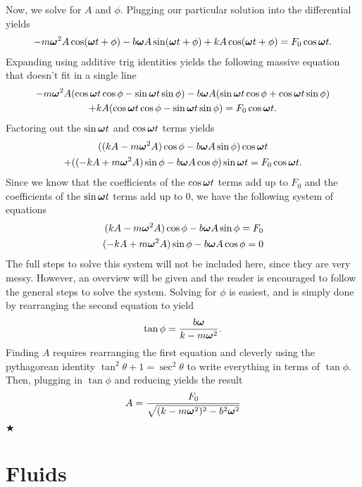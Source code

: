 \noindent Now, we solve for $A$ and $\phi$. Plugging our particular solution into the differential yields
\begin{gather*}
    -m\boldsymbol{\omega}^2A\cos(\boldsymbol{\omega} t +\phi)-b\boldsymbol{\omega} A\sin(\boldsymbol{\omega} t+\phi)+kA\cos(\boldsymbol{\omega} t+\phi) = F_0\cos\boldsymbol{\omega} t.
\end{gather*}
\noindent Expanding using additive trig identities yields the following massive equation that doesn't fit in a single line
\begin{gather*}
        -m\boldsymbol{\omega}^2 A(\cos\boldsymbol{\omega} t\cos\phi-\sin\boldsymbol{\omega} t\sin\phi) - b\boldsymbol{\omega} A(\sin\boldsymbol{\omega} t\cos\phi+\cos\boldsymbol{\omega} t\sin\phi)\\+kA(\cos\boldsymbol{\omega} t\cos\phi-\sin\boldsymbol{\omega} t\sin\phi) = F_0\cos\boldsymbol{\omega} t.
\end{gather*}
\noindent Factoring out the $\sin\boldsymbol{\omega} t$ and $\cos\boldsymbol{\omega} t$ terms yields
\begin{gather*}
    ((kA-m\boldsymbol{\omega}^2A)\cos\phi - b\boldsymbol{\omega} A\sin\phi)\cos\boldsymbol{\omega} t \\+ ((-kA+m\boldsymbol{\omega}^2A)\sin\phi - b\boldsymbol{\omega} A\cos\phi)\sin\boldsymbol{\omega} t = F_0\cos\boldsymbol{\omega} t.
\end{gather*}
\noindent Since we know that the coefficients of the $\cos\boldsymbol{\omega} t$ terms add up to $F_0$ and the coefficients of the $\sin\boldsymbol{\omega} t$ terms add up to $0$, we have the following system of equations
\begin{align}
    (kA-m\boldsymbol{\omega}^2A)\cos\phi - b\boldsymbol{\omega} A\sin\phi = F_0 \\
    (-kA+m\boldsymbol{\omega}^2A)\sin\phi - b\boldsymbol{\omega} A\cos\phi = 0
\end{align}
\noindent The full steps to solve this system will not be included here, since they are very messy. However, an overview will be given and the reader is encouraged to follow the general steps to solve the system. Solving for $\phi$ is easiest, and is simply done by rearranging the second equation to yield
\begin{equation}
    \tan\phi = \frac{b\boldsymbol{\omega}}{k-m\boldsymbol{\omega}^2}.
\end{equation}
\noindent Finding $A$ requires rearranging the first equation and cleverly using the pythagorean identity $\tan^2\theta + 1 =\sec^2\theta$ to write everything in terms of $\tan\phi$. Then, plugging in $\tan\phi$ and reducing yields the result
\begin{equation}
    A = \frac{F_0}{\sqrt{(k-m\boldsymbol{\omega}^2)^2-b^2\boldsymbol{\omega}^2}}
\end{equation}
$\bigstar$

\newpage
\section{Fluids}

